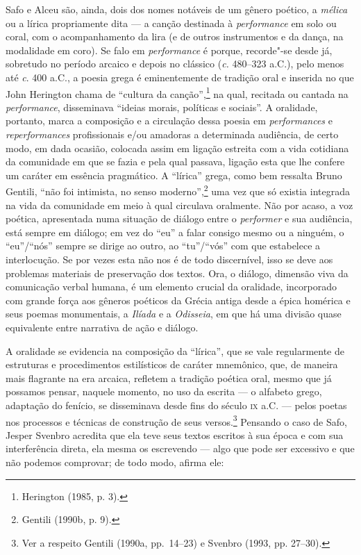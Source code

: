 Safo e Alceu são, ainda, dois dos nomes notáveis de um gênero poético, a
\textit{mélica} ou a lírica propriamente dita --- a canção destinada à
\textit{performance} em solo ou coral,
com o acompanhamento da lira (e de outros instrumentos e da dança, na
modalidade em coro). Se falo em \textit{performance} é porque, recorde"-se
desde já, sobretudo no período arcaico e depois no clássico (\textit{c.}
480--323 a.C.), pelo menos até \textit{c}. 400 a.C., a poesia grega é eminentemente de tradição oral e inserida no
que John Herington chama de “cultura da canção”,\footnote{ Herington (1985, p. 3).} na
qual, recitada ou cantada na \textit{performance}, disseminava
“ideias morais, políticas e sociais”. A oralidade, portanto, marca
a composição e a circulação dessa poesia em \textit{performances} e
\textit{reperformances} profissionais e/ou amadoras a determinada
audiência, de certo modo, em dada ocasião, colocada assim em ligação estreita
com a vida cotidiana da comunidade em que se fazia e pela qual passava, ligação
esta que lhe confere um caráter em essência pragmático. A “lírica” grega,
como bem ressalta Bruno Gentili, “não foi intimista, no senso
moderno”,\footnote{ Gentili (1990b, p. 9).} uma vez que só existia integrada na
vida da comunidade em meio à qual
circulava oralmente. Não por acaso, a voz poética, apresentada numa
situação de diálogo entre o \textit{performer} e sua audiência, está sempre em
diálogo; em vez do “eu” a falar consigo mesmo ou a ninguém, o “eu”/“nós” sempre
se dirige ao outro, ao “tu”/“vós” com que estabelece a interlocução. Se por
vezes esta não nos é de todo discernível, isso se deve aos problemas
materiais de preservação dos textos. Ora, o diálogo, dimensão viva da
comunicação verbal humana, é um elemento crucial da oralidade, incorporado com
grande força aos gêneros poéticos da Grécia antiga desde a épica homérica e
seus poemas monumentais, a \textit{Ilíada} e a \textit{Odisseia}, em que há uma
divisão quase equivalente entre narrativa de ação e diálogo. 

A oralidade se evidencia na composição da “lírica”, que se vale regularmente de
estruturas e procedimentos estilísticos de caráter mnemônico, que,
de maneira mais flagrante na era arcaica, refletem a tradição poética oral,
mesmo que já possamos pensar, naquele momento, no uso da escrita --- o alfabeto
grego, adaptação do fenício, se disseminava desde fins do século \textsc{ix} a.C. ---
pelos poetas nos processos e técnicas de construção de seus
versos.\footnote{ Ver a respeito Gentili (1990a, pp.~14--23) e Svenbro (1993, pp.
27--30).} Pensando o caso de Safo, Jesper Svenbro acredita
que ela teve seus textos escritos à sua época e com sua interferência direta,
ela mesma os escrevendo --- algo que pode ser excessivo e que não podemos
comprovar; de todo modo, afirma ele:

